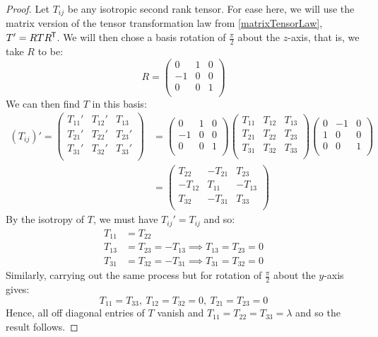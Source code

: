 \documentclass[../main.tex]{subfiles}
\begin{document}
\begin{proof}
  Let $T_{i j}$ be any isotropic second rank tensor.
  For ease here, we will use the matrix version of the tensor transformation law from \cref{matrixTensorLaw}, $T' = RTR^{{\mkern-1.5mu\mathsf{T}}}$.
  We will then chose a basis rotation of $\frac{\pi}{2}$ about the $z$-axis, that is, we take $R$ to be:
  \[
    R = \begin{pmatrix}
    0 & 1 & 0 \\
    -1 & 0 & 0 \\
    0 & 0 & 1 \\
    \end{pmatrix}
  \]
  We can then find $T$ in this basis:
  \begin{align*}
    (T_{i j})' = \begin{pmatrix}
    T_{1 1}' & T_{1 2}' & T_{1 3} \\
    T_{2 1}' & T_{2 2}' & T_{2 3}' \\
    T_{3 1}' & T_{3 2}' & T_{3 3}' \\
    \end{pmatrix} &= \begin{pmatrix}
    0 & 1 & 0 \\
    -1 & 0 & 0 \\
    0 & 0 & 1 \\
    \end{pmatrix} \begin{pmatrix}
    T_{1 1} & T_{1 2} & T_{1 3} \\
    T_{2 1} & T_{2 2} & T_{2 3} \\
    T_{3 1} & T_{3 2} & T_{3 3} \\
    \end{pmatrix} \begin{pmatrix}
    0 & -1 & 0 \\
    1 & 0 & 0 \\
    0 & 0 & 1 \\
    \end{pmatrix} \\
    &= \begin{pmatrix}
    T_{2 2} & -T_{2 1} & T_{2 3} \\
    -T_{1 2} & T_{1 1} & -T_{1 3} \\
    T_{3 2} & -T_{3 1} & T_{3 3} \\
    \end{pmatrix}
  \end{align*}
  By the isotropy of $T$, we must have $T_{i j}' = T_{i j}$ and so:
  \begin{align*}
    T_{1 1} &= T_{2 2} \\
    T_{1 3} &= T_{2 3} = -T_{1 3} \implies T_{1 3} = T_{2 3} = 0 \\
    T_{3 1} &= T_{3 2} = -T_{3 1} \implies T_{3 1} = T_{3 2} = 0
  \end{align*}
  Similarly, carrying out the same process but for rotation of $\frac{\pi}{2}$ about the $y$-axis gives:
  \[
    T_{1 1} = T_{3 3},\ T_{1 2} = T_{3 2} = 0,\ T_{2 1} = T_{2 3} = 0
  \]
  Hence, all off diagonal entries of $T$ vanish and $T_{1 1} = T_{2 2} = T_{3 3} = \lambda$ and so the result follows.
\end{proof}
\end{document}
